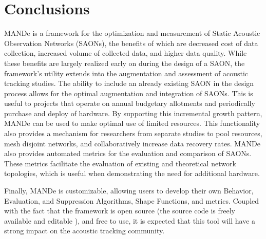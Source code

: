 \chapter{Conclusions}
MANDe is a framework for the optimization and measurement of Static Acoustic Observation Networks (SAONs), the benefits of which are decreased cost of data collection, increased volume of collected data, and higher data quality.  While these benefits are largely realized early on during the design of a SAON, the framework's utility extends into the augmentation and assessment of acoustic tracking studies.  The ability to include an already existing SAON in the design process allows for the optimal augmentation and integration of SAONs.  This is useful to projects that operate on annual budgetary allotments and periodically purchase and deploy of hardware.  By supporting this incremental growth pattern, MANDe can be used to make optimal use of limited resources.  This functionality also provides a mechanism for researchers from separate studies to pool resources, mesh disjoint networks, and collaboratively increase data recovery rates.  MANDe also provides automated metrics for the evaluation and comparison of SAONs.  These metrics facilitate the evaluation of existing and theoretical network topologies, which is useful when demonstrating the need for additional hardware.

Finally, MANDe is customizable, allowing users to develop their own Behavior, Evaluation, and Suppression Algorithms, Shape Functions, and metrics.  Coupled with the fact that the framework is open source (the source code is freely available and editable \cite{acousitcdeploy}), and free to use, it is expected that this tool will have a strong impact on the acoustic tracking community.  
